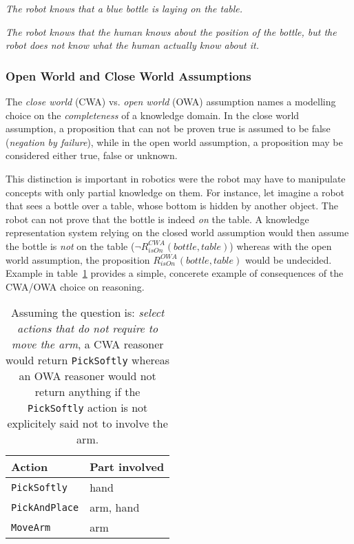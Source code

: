\documentclass[a4paper, twocolumn]{article}
\begin{document}
\emph{The robot knows that a blue bottle is laying on the table.}

\emph{The robot knows that the human knows about the position of the bottle,
but the robot does not know what the human actually know about it.}

\subsubsection{Open World and Close World Assumptions}

The \emph{close world} (CWA) vs. \emph{open world} (OWA) assumption names a
modelling choice on the \emph{completeness} of a knowledge domain. In the close
world assumption, a proposition that can not be proven true is assumed to be
false (\emph{negation by failure}), while in the open world assumption, a
proposition may be considered either true, false or unknown.

This distinction is important in robotics were the robot may have to manipulate
concepts with only partial knowledge on them. For instance, let imagine a robot
that sees a bottle over a table, whose bottom is hidden by another object. The
robot can not prove that the bottle is indeed \emph{on} the table. A knowledge
representation system relying on the closed world assumption would then assume
the bottle is \emph{not} on the table ($\lnot R^{CWA}_{isOn}(bottle, table)$)
whereas with the open world assumption, the proposition $R^{OWA}_{isOn}(bottle,
table)$ would be undecided. Example in table~\ref{table|cwa-owa-example} provides
a simple, concerete example of consequences of the CWA/OWA choice on reasoning.

\begin{table}
	\begin{center}
	\begin{tabular}{ll}
	{\bf Action} & {\bf Part involved} \\
	\hline
	{\tt PickSoftly} & hand \\
	{\tt PickAndPlace} & arm, hand \\
	{\tt MoveArm} & arm \\
	\hline
	\end{tabular}
	\end{center}
	\caption{Assuming the question is: \emph{select actions that do not require
	to move the arm}, a CWA reasoner would return {\tt PickSoftly} whereas an
	OWA reasoner would not return anything if the {\tt PickSoftly} action is
	not explicitely said not to involve the arm.}
	\label{table|cwa-owa-example}
\end{table}
\end{document}
